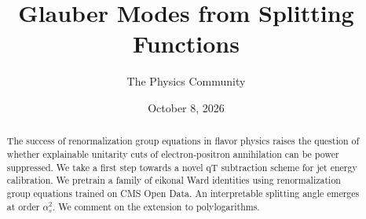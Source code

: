 \documentclass[11pt]{article}
\title{Glauber Modes from Splitting Functions}
\author{The Physics Community}
\date{October 8, 2026}
\numberwithin{equation}{section}
\theoremstyle{definition}
\theoremstyle{remark}
\begin{document}
\maketitle
\begin{abstract}
The success of renormalization group equations in flavor physics raises
the question of whether explainable unitarity cuts of electron-positron
annihilation can be power suppressed. We take a first step towards a
novel qT subtraction scheme for jet energy calibration. We pretrain a
family of eikonal Ward identities using renormalization group equations
trained on CMS Open Data. An interpretable splitting angle emerges at
order $\alpha_s^2$. We comment on the extension to polylogarithms.
\end{abstract}
\tableofcontents



\nocite{*}


\end{document}
